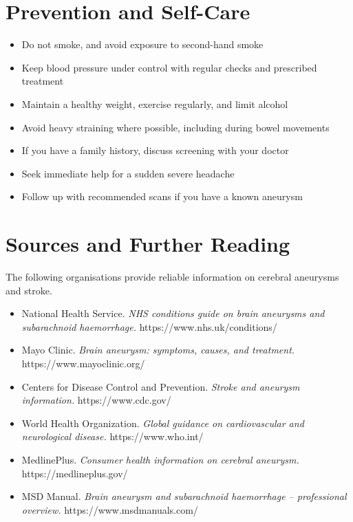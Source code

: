 \section*{Prevention and Self-Care}
\begin{itemize}
    \item Do not smoke, and avoid exposure to second-hand smoke
    \item Keep blood pressure under control with regular checks and prescribed treatment
    \item Maintain a healthy weight, exercise regularly, and limit alcohol
    \item Avoid heavy straining where possible, including during bowel movements
    \item If you have a family history, discuss screening with your doctor
    \item Seek immediate help for a sudden severe headache
    \item Follow up with recommended scans if you have a known aneurysm
\end{itemize}

\section*{Sources and Further Reading}
The following organisations provide reliable information on cerebral aneurysms and stroke.

\begin{itemize}
    \item National Health Service. \textit{NHS conditions guide on brain aneurysms and subarachnoid haemorrhage.} https://www.nhs.uk/conditions/
    \item Mayo Clinic. \textit{Brain aneurysm: symptoms, causes, and treatment.} https://www.mayoclinic.org/
    \item Centers for Disease Control and Prevention. \textit{Stroke and aneurysm information.} https://www.cdc.gov/
    \item World Health Organization. \textit{Global guidance on cardiovascular and neurological disease.} https://www.who.int/
    \item MedlinePlus. \textit{Consumer health information on cerebral aneurysm.} https://medlineplus.gov/
    \item MSD Manual. \textit{Brain aneurysm and subarachnoid haemorrhage -- professional overview.} https://www.msdmanuals.com/
\end{itemize}
